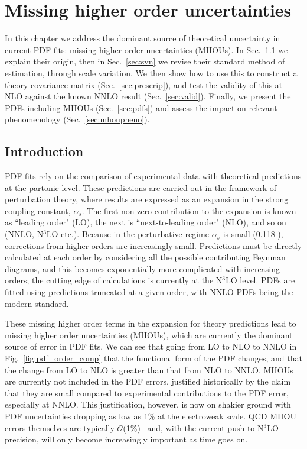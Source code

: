 \chapter{Missing higher order uncertainties}

In this chapter we address the dominant source of theoretical uncertainty in current PDF fits: missing higher order uncertainties (MHOUs). In Sec.~\ref{sec:intro} we explain their origin, then in Sec.~\ref{sec:svn} we revise their standard method of estimation, through scale variation. We then show how to use this to construct a theory covariance matrix (Sec.~\ref{sec:prescrip}), and test the validity of this at NLO against the known NNLO result (Sec.~\ref{sec:valid}). Finally, we present the PDFs including MHOUs (Sec.~\ref{sec:pdfs}) and assess the impact on relevant phenomenology (Sec.~\ref{sec:mhoupheno}).

\section{Introduction}
\label{sec:intro}
PDF fits rely on the comparison of experimental data with theoretical predictions at the partonic level. These predictions are carried out in the framework of perturbation theory, where results are expressed as an expansion in the strong coupling constant, $\alpha_s$. The first non-zero contribution to the expansion is known as ``leading order" (LO), the next is ``next-to-leading order" (NLO), and so on (NNLO, N$^3$LO etc.). Because in the perturbative regime $\alpha_s$ is small (0.118 \cite{pdg}), corrections from higher orders are increasingly small. Predictions must be directly calculated at each order by considering all the possible contributing Feynman diagrams, and this becomes exponentially more complicated with increasing orders; the cutting edge of calculations is currently at the N$^3$LO level. PDFs are fitted using predictions truncated at a given order, with NNLO PDFs being the modern standard. 

These missing higher order terms in the expansion for theory predictions lead to missing higher order uncertainties (MHOUs), which are currently the dominant source of error in PDF fits. We can see that going from LO to NLO to NNLO in Fig.~\ref{fig:pdf_order_comp} that the functional form of the PDF changes, and that the change from LO to NLO is greater than that from NLO to NNLO. MHOUs are currently not included in the PDF errors, justified historically by the claim that they are small compared to experimental contributions to the PDF error, especially at NNLO. This justification, however, is now on shakier ground with PDF uncertainties dropping as low as 1\% at the electroweak scale. QCD MHOU errors themselves are typically $\mathcal{O}$(1\%)~\cite{Campbell:2017hsr} and, with the current push to N$^3$LO precision, will only become increasingly important as time goes on. 

